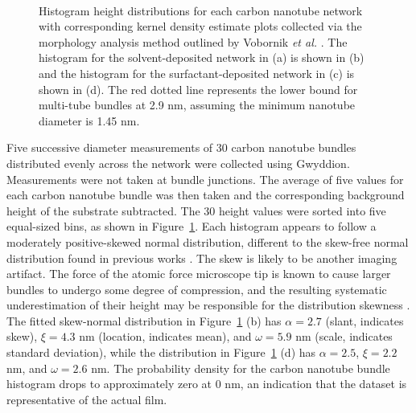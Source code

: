 \documentclass[
  a4paper,
]{scrbook}
\begin{document}
\begin{figure}
\begin{minipage}[t]{0.45\linewidth}
\end{minipage}%
%
\begin{minipage}[t]{0.01\linewidth}

{\centering 

~

}

\end{minipage}%

\caption{\label{fig-cnt-histogram}Histogram height distributions for
each carbon nanotube network with corresponding kernel density estimate
plots collected via the morphology analysis method outlined by Vobornik
\emph{et al.} \autocite{Vobornik2023}. The histogram for the
solvent-deposited network in (a) is shown in (b) and the histogram for
the surfactant-deposited network in (c) is shown in (d). The red dotted
line represents the lower bound for multi-tube bundles at 2.9 nm,
assuming the minimum nanotube diameter is 1.45 nm.}

\end{figure}

Five successive diameter measurements of 30 carbon nanotube bundles
distributed evenly across the network were collected using Gwyddion.
Measurements were not taken at bundle junctions. The average of five
values for each carbon nanotube bundle was then taken and the
corresponding background height of the substrate subtracted. The 30
height values were sorted into five equal-sized bins, as shown in
Figure~\ref{fig-cnt-histogram}. Each histogram appears to follow a
moderately positive-skewed normal distribution, different to the
skew-free normal distribution found in previous works
\autocite{LeMieux2008,Liu2013,Vobornik2023}. The skew is likely to be
another imaging artifact. The force of the atomic force microscope tip
is known to cause larger bundles to undergo some degree of compression,
and the resulting systematic underestimation of their height may be
responsible for the distribution skewness \autocite{Vobornik2023}. The
fitted skew-normal distribution in Figure~\ref{fig-cnt-histogram} (b)
has \(\alpha = 2.7\) (slant, indicates skew), \(\xi = 4.3\) nm
(location, indicates mean), and \(\omega = 5.9\) nm (scale, indicates
standard deviation), while the distribution in
Figure~\ref{fig-cnt-histogram} (d) has \(\alpha = 2.5\), \(\xi = 2.2\)
nm, and \(\omega = 2.6\) nm. The probability density for the carbon
nanotube bundle histogram drops to approximately zero at 0 nm, an
indication that the dataset is representative of the actual film.
\end{document}
